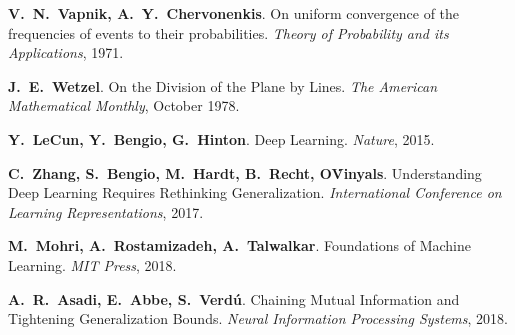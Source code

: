 \documentclass[twocolumn]{article}
\theoremstyle{definition}
\begin{document}
        \footnotesize
        \begin{thebibliography}{9}

            \textbf{V.\ N.\ Vapnik, A.\ Y.\ Chervonenkis}.
            On uniform convergence of the frequencies of events to their probabilities.
            \textit{Theory of Probability and its Applications}, 1971.

            \textbf{J.\ E.\ Wetzel}.
            On the Division of the Plane by Lines.
            \textit{The American Mathematical Monthly}, October 1978.

            \textbf{Y.\ LeCun, Y.\ Bengio, G.\ Hinton}.
            Deep Learning.
            \textit{Nature}, 2015.

            \textbf{C.\ Zhang, S.\ Bengio, M.\ Hardt, B.\ Recht, O\. Vinyals}.
            Understanding Deep Learning Requires Rethinking Generalization.
            \textit{International Conference on Learning Representations}, 2017.

            \textbf{M.\ Mohri, A.\ Rostamizadeh, A.\ Talwalkar}.
            Foundations of Machine Learning.
            \textit{MIT Press}, 2018.

            \textbf{A.\ R.\ Asadi, E.\ Abbe, S.\ Verd\'u}.
            Chaining Mutual Information and Tightening Generalization Bounds.
            \textit{Neural Information Processing Systems}, 2018.

        \end{thebibliography}
\end{document}
